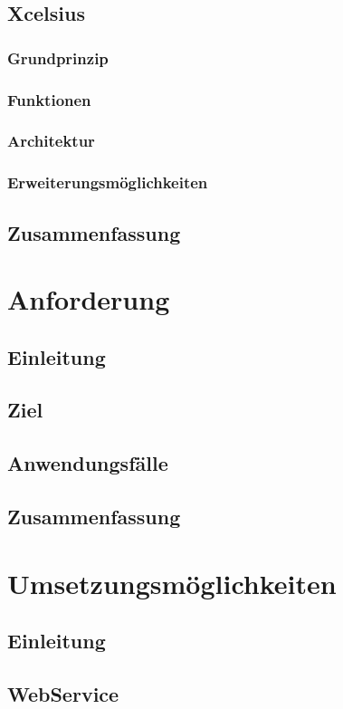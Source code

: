 \section{Xcelsius}
\subsection{Grundprinzip}
\subsection{Funktionen}
\subsection{Architektur}
\subsection{Erweiterungsmöglichkeiten}
\section{Zusammenfassung}

\chapter{Anforderung}
\section{Einleitung}
\section{Ziel}
\section{Anwendungsfälle}
\section{Zusammenfassung}

\chapter{Umsetzungsmöglichkeiten}
\section{Einleitung}
\section{WebService}
